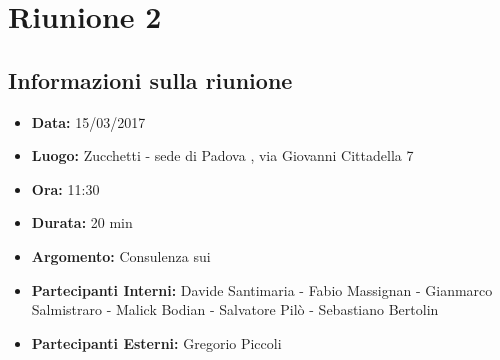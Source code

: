 	\section{Riunione 2}
	  \subsection{Informazioni sulla riunione}
	    \begin{itemize}
	      \item \textbf{Data: } 15/03/2017
	      \item \textbf{Luogo: } Zucchetti - sede di Padova , via Giovanni Cittadella 7
	      \item \textbf{Ora: } 11:30
	      \item \textbf{Durata: } 20 min
	      \item \textbf{Argomento: } Consulenza sui 
	      \item \textbf{Partecipanti Interni: } Davide Santimaria - Fabio Massignan - Gianmarco Salmistraro - Malick Bodian - Salvatore Pilò - Sebastiano Bertolin
	      \item \textbf{Partecipanti Esterni: } Gregorio Piccoli
	    \end{itemize}
	    
